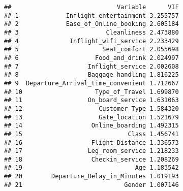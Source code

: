 \documentclass[
]{article}
\newenvironment{Shaded}{\begin{snugshade}}{\end{snugshade}}
\newcommand{\AttributeTok}[1]{\textcolor[rgb]{0.13,0.29,0.53}{#1}}
\newcommand{\CommentTok}[1]{\textcolor[rgb]{0.56,0.35,0.01}{\textit{#1}}}
\newcommand{\ConstantTok}[1]{\textcolor[rgb]{0.56,0.35,0.01}{#1}}
\newcommand{\FunctionTok}[1]{\textcolor[rgb]{0.13,0.29,0.53}{\textbf{#1}}}
\newcommand{\NormalTok}[1]{#1}
\newcommand{\OtherTok}[1]{\textcolor[rgb]{0.56,0.35,0.01}{#1}}
\newcommand{\SpecialCharTok}[1]{\textcolor[rgb]{0.81,0.36,0.00}{\textbf{#1}}}
\newcommand{\StringTok}[1]{\textcolor[rgb]{0.31,0.60,0.02}{#1}}
\begin{document}
\begin{Shaded}
\end{Shaded}

\begin{verbatim}
##                             Variable      VIF
## 1             Inflight_entertainment 3.255757
## 2             Ease_of_Online_booking 2.605184
## 3                        Cleanliness 2.473880
## 4              Inflight_wifi_service 2.233429
## 5                       Seat_comfort 2.055698
## 6                     Food_and_drink 2.024997
## 7                   Inflight_service 2.002608
## 8                   Baggage_handling 1.816225
## 9  Departure_Arrival_time_convenient 1.712667
## 10                    Type_of_Travel 1.699870
## 11                  On_board_service 1.631063
## 12                     Customer_Type 1.584320
## 13                     Gate_location 1.521679
## 14                   Online_boarding 1.492315
## 15                             Class 1.456741
## 16                   Flight_Distance 1.336573
## 17                  Leg_room_service 1.218233
## 18                   Checkin_service 1.208269
## 19                               Age 1.183542
## 20        Departure_Delay_in_Minutes 1.019193
## 21                            Gender 1.007146
\end{verbatim}
\end{document}
